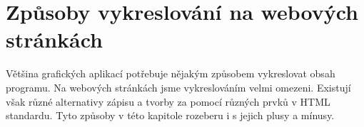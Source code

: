 





\section{Způsoby vykreslování na webových stránkách}\label{text:vykreslovani}

Většina grafických aplikací potřebuje nějakým způsobem vykreslovat obsah programu.
Na webových stránkách jsme vykreslováním velmi omezeni.
Existují však různé alternativy zápisu a tvorby za pomocí různých prvků v HTML standardu.
Tyto způsoby v této kapitole rozeberu i s jejich plusy a mínusy.

